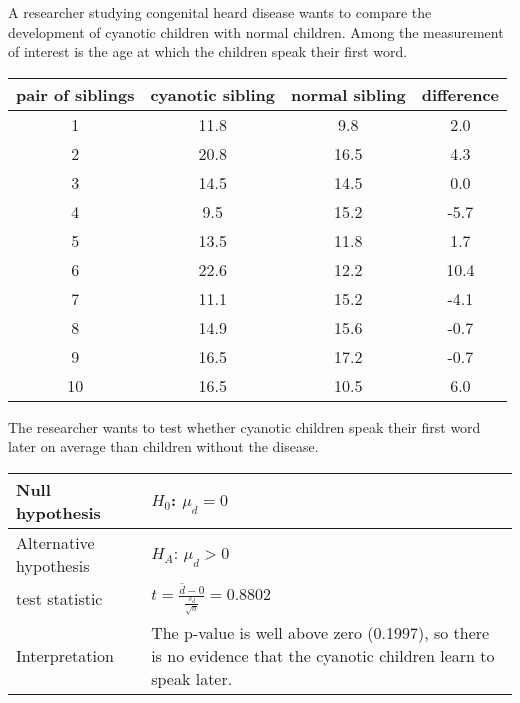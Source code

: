 \begin{example}
	A researcher studying congenital heard disease wants to compare the development of cyanotic children with normal children. Among the measurement of interest is the age at which the children speak their first word.
	\begin{center}
		\begin{tabular}{c|cc|c}
			\textbf{pair of siblings} & \textbf{cyanotic sibling} & \textbf{normal sibling} & \textbf{difference} \\
			\hline
			1 & 11.8 & 9.8 & 2.0 \\
			2 & 20.8 & 16.5 & 4.3 \\
			3 & 14.5 & 14.5 & 0.0 \\
			4 & 9.5 & 15.2 & -5.7 \\
			5 & 13.5 & 11.8 & 1.7 \\
			6 & 22.6 & 12.2 & 10.4 \\
			7 & 11.1 & 15.2 & -4.1 \\
			8 & 14.9 & 15.6 & -0.7 \\
			9 & 16.5 & 17.2 & -0.7 \\
			10 & 16.5 & 10.5 & 6.0 \\
		\end{tabular}
	\end{center}
	The researcher wants to test whether cyanotic children speak their first word later on average than children without the disease.
	\begin{center}
		\begin{tabular}{p{4cm}|p{7cm}}
			Null hypothesis & $H_0$: $\mu_d = 0$ \\
			\hline
			Alternative hypothesis & $H_A$: $\mu_d > 0$ \\
			\hline
			test statistic & $t = \frac{\bar{d}-0}{\frac{s_d}{\sqrt{n}}} = 0.8802$ \\
			\hline
			Interpretation & The p-value is well above zero (0.1997), so there is no evidence that the cyanotic children learn to speak later.
		\end{tabular}
	\end{center}
	\begin{center}
	\end{center}
\end{example}

